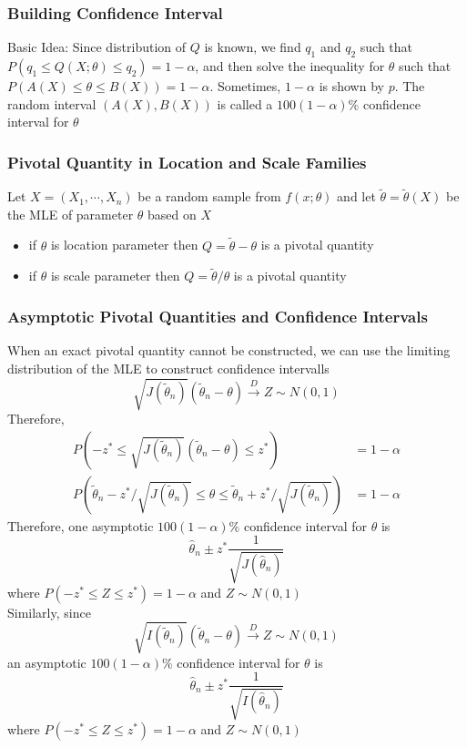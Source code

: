\documentclass[11pt]{article}
\begin{document}
\subsubsection{Building Confidence Interval}
Basic Idea: Since distribution of $Q$ is known, we find $q_1$ and $q_2$ such that $P(q_1\leq Q(X;\theta)\leq q_2)=1-\alpha$, and then solve the 
inequality for $\theta$ such that $P(A(X)\leq\theta\leq B(X))=1-\alpha$. Sometimes, $1-\alpha$ is shown by $p$. The random interval $(A(X),B(X))$
is called a $100(1-\alpha)\%$ confidence interval for $\theta$
\subsubsection{Pivotal Quantity in Location and Scale Families}
Let $X = (X_1,\cdots,X_n)$ be a random sample from $f(x;\theta)$ and let $\tilde{\theta} = \tilde{\theta}(X)$ be the MLE of parameter $\theta$
based on $X$
\begin{itemize}
    \item if $\theta$ is location parameter then $Q=\tilde{\theta}-\theta$ is a pivotal quantity 
    \item if $\theta$ is scale parameter then $Q=\tilde{\theta}/\theta$ is a pivotal quantity
\end{itemize}
\subsubsection{Asymptotic Pivotal Quantities and Confidence Intervals}
When an exact pivotal quantity cannot be constructed, we can use the limiting distribution of the MLE to 
construct confidence intervalls
\[\sqrt{J(\tilde{\theta}_n)}(\tilde{\theta}_n-\theta)\overset{D}{\rightarrow}Z\sim N(0,1)\]
Therefore,
\begin{align*}
    P(-z^*\leq\sqrt{J(\tilde{\theta}_n)}(\tilde{\theta}_n-\theta)\leq z^*) &= 1-\alpha \\
    P(\tilde{\theta}_n-z^*/\sqrt{J(\tilde{\theta}_n)}\leq\theta\leq\tilde{\theta}_n+z^*/\sqrt{J(\tilde{\theta}_n)}) &= 1-\alpha
\end{align*}
Therefore, one asymptotic $100(1-\alpha)\%$ confidence interval for $\theta$ is
\[\hat\theta_n \pm z^*\frac{1}{\sqrt{J(\hat\theta_n)}}\]
where $P(-z^*\leq Z\leq z^*)=1-\alpha$ and $Z\sim N(0,1)$ \\
Similarly, since 
\[\sqrt{I(\tilde{\theta}_n)}(\tilde{\theta}_n-\theta)\overset{D}{\rightarrow}Z\sim N(0,1)\]
an asymptotic $100(1-\alpha)\%$ confidence interval for $\theta$ is
\[\hat\theta_n \pm z^*\frac{1}{\sqrt{I(\hat\theta_n)}}\]
where $P(-z^*\leq Z\leq z^*)=1-\alpha$ and $Z\sim N(0,1)$
\end{document}
